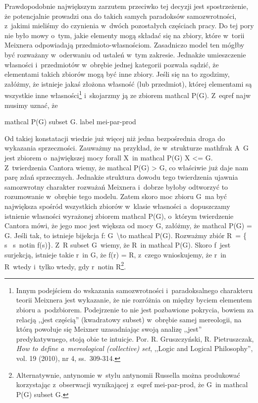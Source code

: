 Prawdopodobnie największym zarzutem przeciwko tej decyzji jest spostrzeżenie, że potencjalnie prowadzi ona do takich samych paradoksów samozwrotności, z~jakimi mieliśmy do czynienia w~dwóch pozostałych częściach pracy. Do tej pory nie było mowy o~tym, jakie elementy mogą składać się na zbiory, które w~torii Meixnera odpowiadają przedmioto-własnościom. Zasadniczo model ten mógłby być rozważany w~oderwaniu od ustaleń w~tym zakresie. Jednakże umieszczenie własności i~przedmiotów w~obrębie jednej kategorii pozwala sądzić, że elementami takich zbiorów mogą być inne zbiory. Jeśli się na to zgodzimy, załóżmy, że istnieje jakaś złożona własność (lub przedmiot), której elementami są wszystkie inne własności\footnote{Innym podejściem do wskazania samozwrotności i~paradoksalnego charakteru teorii Meixnera jest wykazanie, że nie rozróżnia on między byciem elementem zbioru a~podzbiorem. Podejrzenie to nie jest pozbawione pokrycia, bowiem za relacją ,,jest częścią'' (kwadratowy subset) w~obrębie samej mereologii, na którą powołuje się Meixner uzasadniając swoją analizę ,,jest'' predykatywnego, stoją obie te intuicje. Por. R. Gruszczyński, R. Pietruszczak, \textit{How to define a~mereological (collective) set}, ,,Logic and Logical Philosophy'', vol. 19 (2010), nr 4, ss.~309-314.} i~skojarzmy ją ze zbiorem mathcal P(G). Z~eqref najw musimy uznać, że

mathcal P(G) subset G. label mei-par-prod

Od takiej konstatacji wiedzie już więcej niż jedna bezpośrednia droga do wykazania sprzeczności. Zauważmy na przykład, że w~strukturze mathfrak A~G jest zbiorem o~największej mocy forall X~in mathcal P(G) {\textbar}X{\textbar} {\textless}= {\textbar}G{\textbar}. Z~twierdzenia Cantora wiemy, że {\textbar}mathcal P(G){\textbar} {\textgreater} {\textbar}G{\textbar}, co właściwie już daje nam parę zdań sprzecznych. Jednakże struktura dowodu tego twierdzenia ujawnia samozwrotny charakter rozważań Meixnera i~dobrze byłoby odtworzyć to rozumowanie w~obrębie tego modelu. Zatem skoro moc zbioru G~ma być największa spośród wszystkich zbiorów w~klasie własności a~dopuszczamy istnienie własności wyrażonej zbiorem mathcal P(G), o~którym twierdzenie Cantora mówi, że jego moc jest większa od mocy G, załóżmy, że {\textbar}mathcal P(G){\textbar} = {\textbar}G{\textbar}. Jeśli tak, to istnieje bijekcja f: G~{\textbackslash}to mathcal P(G). Rozważmy zbiór R~= \{ s~{\textbar} s~notin f(s)\}. Z~R subset G~wiemy, że R~in mathcal P(G). Skoro f~jest surjekcją, istnieje takie r~in G, że f(r) = R, z~czego wnioskujemy, że r~in R~wtedy i~tylko wtedy, gdy r~notin R\footnote{Alternatywnie, antynomie w~stylu antynomii Russella można produkować korzystając z~obserwacji wynikającej z~eqref mei-par-prod, że G~in mathcal P(G) subset G.}.

